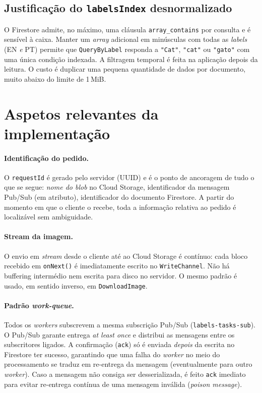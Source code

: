 \documentclass[11pt,a4paper]{article}
\begin{document}
\subsection{Justifica\c{c}\~ao do \texttt{labelsIndex} desnormalizado}
O Firestore admite, no m\'aximo, uma cl\'ausula \texttt{array\_contains}
por consulta e \'e sens\'ivel \`a caixa. Manter um \emph{array} adicional
em min\'usculas com todas as \emph{labels} (EN \emph{e} PT) permite que
\texttt{QueryByLabel} responda a \texttt{"Cat"}, \texttt{"cat"} ou
\texttt{"gato"} com uma \'unica condi\c{c}\~ao indexada. A filtragem
temporal \'e feita na aplica\c{c}\~ao depois da leitura. O custo \'e
duplicar uma pequena quantidade de dados por documento, muito abaixo do
limite de 1\,MiB.

\section{Aspetos relevantes da implementa\c{c}\~ao}
\label{sec:impl}

\paragraph{Identifica\c{c}\~ao do pedido.}
O \texttt{requestId} \'e gerado pelo servidor (UUID) e \'e o ponto de
ancoragem de tudo o que se segue: \emph{nome do blob} no Cloud Storage,
identificador da mensagem Pub/Sub (em atributo), identificador do
documento Firestore. A partir do momento em que o cliente o recebe,
toda a informa\c{c}\~ao relativa ao pedido \'e localiz\'avel sem ambiguidade.

\paragraph{Stream da imagem.}
O envio em \emph{stream} desde o cliente at\'e ao Cloud Storage \'e
cont\'inuo: cada bloco recebido em \texttt{onNext()} \'e imediatamente
escrito no \texttt{WriteChannel}. N\~ao h\'a buffering interm\'edio nem
escrita para disco no servidor. O mesmo padr\~ao \'e usado, em sentido
inverso, em \texttt{DownloadImage}.

\paragraph{Padr\~ao \emph{work-queue}.}
Todos os \emph{workers} subscrevem a mesma subscri\c{c}\~ao Pub/Sub
(\texttt{labels-tasks-sub}). O Pub/Sub garante entrega \emph{at least
once} e distribui as mensagens entre os subscritores ligados. A
confirma\c{c}\~ao (\texttt{ack}) s\'o \'e enviada \emph{depois} da escrita no
Firestore ter sucesso, garantindo que uma falha do \emph{worker} no
meio do processamento se traduz em re-entrega da mensagem
(eventualmente para outro \emph{worker}). Caso a mensagem n\~ao consiga
ser desserializada, \'e feito \texttt{ack} imediato para evitar
re-entrega cont\'inua de uma mensagem inv\'alida (\emph{poison message}).
\end{document}
